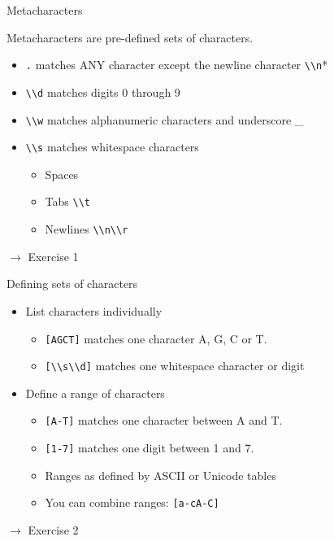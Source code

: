 \documentclass{beamer}
\begin{document}
\begin{frame}{Metacharacters}

Metacharacters are pre-defined sets of characters.
 \begin{itemize}
  \item \lstinline$.$ matches ANY character except the newline character \lstinline$\\n$*
  \item \lstinline$\\d$ matches digits 0 through 9
  \item \lstinline$\\w$ matches alphanumeric characters and underscore \_
  \item \lstinline$\\s$ matches whitespace characters
    \begin{itemize}
     \item Spaces 
     \item Tabs \lstinline$\\t$
     \item Newlines \lstinline$\\n\\r$
    \end{itemize}
 \end{itemize}

 \bigskip
 $\rightarrow$ Exercise 1
\end{frame}

\begin{frame}{Defining sets of characters}
 \begin{itemize}
  \item List characters individually
    \begin{itemize}
      \item \lstinline$[AGCT]$ matches one character A, G, C or T.
      \item \lstinline$[\\s\\d]$ matches one whitespace character or digit
    \end{itemize}
  \item Define a range of characters
    \begin{itemize}
      \item \lstinline$[A-T]$ matches one character between A and T.
      \item \lstinline$[1-7]$ matches one digit between 1 and 7.
      \item Ranges as defined by ASCII or Unicode tables
      \item You can combine ranges: \lstinline$[a-cA-C]$
    \end{itemize}
 \end{itemize}

 \bigskip
 $\rightarrow$ Exercise 2

\end{frame}
\end{document}

